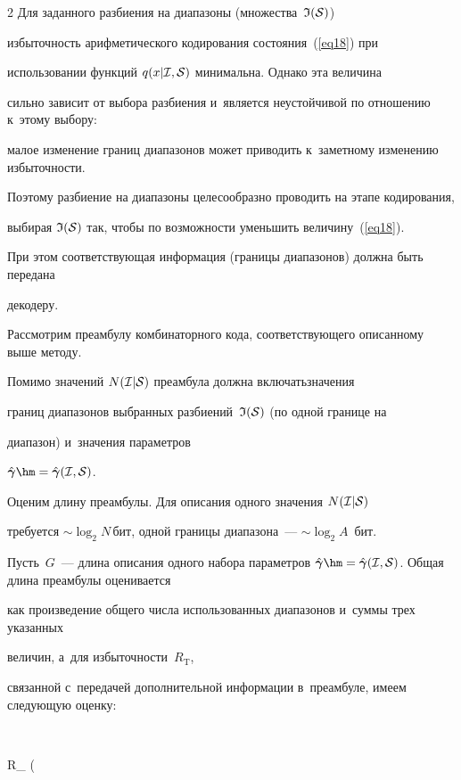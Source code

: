 \begin{multicols}{2}
Для заданного разбиения на диапазоны (множества~${\frak I}({\cal S})$) 

избыточность арифметического кодирования состояния~(\ref{eq18}) при 

использовании функций $q(x|{\cal I},{\cal S})$ минимальна. Однако эта величина 

сильно зависит от выбора разбиения и~является неустойчивой по отношению к~этому выбору: 

малое изменение границ диапазонов может приводить к~заметному изменению избыточности. 

Поэтому разбиение на диапазоны целесообразно проводить на этапе кодирования, 

выбирая ${\frak I}({\cal S})$ так, чтобы по возможности уменьшить величину~(\ref{eq18}). 

При этом соответствующая информация (границы диапазонов) должна быть передана 

декодеру.



Рассмотрим преамбулу комбинаторного кода, соответствующего описанному выше методу. 

Помимо значений $N({\cal I}|{\cal S})$ преамбула должна включать\linebreak значения 

границ диапазонов выбранных раз\-би\-ений~${\frak I}({\cal S})$ (по одной границе на 

диапазон) и~значения параметров 

$\hat{\boldsymbol{\gamma}}\hm=\hat{\boldsymbol{\gamma}}({\cal I},{\cal S})$. 

Оценим длину преамбулы. Для описания одного значения $N({\cal I}|{\cal S})$\linebreak 

требуется $\sim\log_{2}N$\,бит, одной границы диапазона~---   $\sim\log_{2}A$~бит. 

Пусть~$G$~--- длина описания одного набора параметров  $\hat{\boldsymbol{\gamma}}\hm=

\hat{\boldsymbol{\gamma}}({\cal I},{\cal S})$. Общая длина преамбулы оценивается 

как произведение общего числа использованных диапазонов и~суммы трех указанных 

величин, а~для избыточности~$R_{\mathrm{T}}$, 

связанной с~передачей дополнительной информации в~преамбуле, имеем следующую оценку:

$$

R_{} \simeq {} \left( 


\end{multicols}
